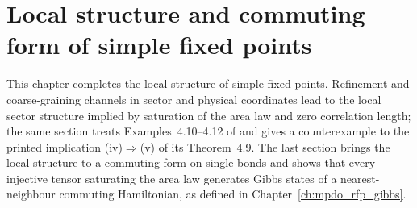 \chapter{Local structure and commuting form of simple fixed points}
\label{ch:mpdo_rfp_gibbs_local_structure}

This chapter completes the local structure of simple fixed points. Refinement
and coarse-graining channels in sector and physical coordinates lead to the
local sector structure implied by saturation of the area law and zero
correlation length; the same section treats Examples~4.10--4.12 of
\cite{Cirac2016MPDO_arXiv} and gives a counterexample to the printed
implication (iv)$\Rightarrow$(v) of its Theorem~4.9. The last section brings
the local structure to a commuting form on single bonds and shows that every
injective tensor saturating the area law generates Gibbs states of a
nearest-neighbour commuting Hamiltonian, as defined in
Chapter~\ref{ch:mpdo_rfp_gibbs}.



